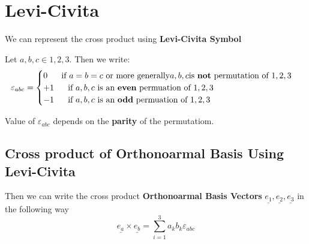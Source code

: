 \section{Levi-Civita}
We can represent the cross product using {\bf Levi-Civita Symbol}

\begin{definition}
	Let $a, b, c \in {1,2,3}$. Then we write:
	\begin{equation}
		\label{eq:levi-civita}
		\varepsilon_{abc}
		=
		\begin{cases}
			0  \ \ \ \ \  \text{if } \space a = b = c  \space \space \text{ or more generally} \space a,b,c \space \text{is {\bf not} permutation of } \space 1,2,3 \\
			+1  \ \ \ \ \  \text{if } \space a,b,c \space \text{ is an {\bf even} permuation of } \space 1,2,3                                                      \\
			-1  \ \ \ \ \ \text{if } \space a,b,c \space \text{ is an {\bf odd} permuation of } \space 1,2,3
		\end{cases}
	\end{equation}
\end{definition}

\begin{note}
	Value of $\varepsilon_{abc}$ depends on the {\bf parity} of the permutatiom.
\end{note}

\subsection{Cross product of Orthonoarmal Basis Using Levi-Civita}
\begin{definition}
	Then we can write the cross product {\bf Orthonoarmal Basis Vectors} $\underline{e_1}, \underline{e_2}, \underline{e_3}$ in the following way
	\begin{equation}
		\label{eq: levi-orthonormal}
		\underline{e_a} \times \underline{e_b} = \sum_{i=1}^{3}a_{k}b_{k}\varepsilon_{abc}
	\end{equation}

\end{definition}

